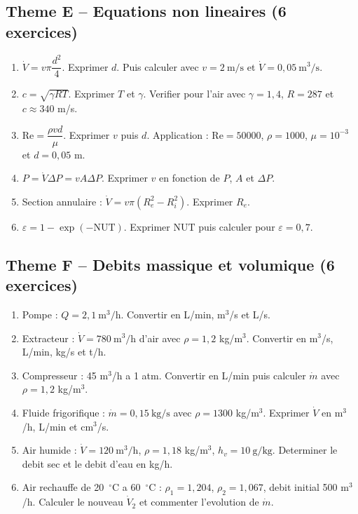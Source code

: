 \subsection*{Theme E -- Equations non lineaires (6 exercices)}
\begin{enumerate}[label=\textbf{E\arabic*}, leftmargin=1.8cm, itemsep=0.4em]
  \item $\dot{V} = v \pi \dfrac{d^2}{4}$. Exprimer $d$. Puis calculer avec $v = 2~\mathrm{m/s}$ et $\dot{V} = 0{,}05~\mathrm{m^3/s}$.
  \item $c = \sqrt{\gamma R T}$. Exprimer $T$ et $\gamma$. Verifier pour l'air avec $\gamma = 1{,}4$, $R = 287$ et $c \approx 340$ m/s.
  \item $\mathrm{Re} = \dfrac{\rho v d}{\mu}$. Exprimer $v$ puis $d$. Application : $\mathrm{Re} = 50000$, $\rho = 1000$, $\mu = 10^{-3}$ et $d = 0{,}05$ m.
  \item $P = \dot{V} \Delta P = v A \Delta P$. Exprimer $v$ en fonction de $P$, $A$ et $\Delta P$.
  \item Section annulaire : $\dot{V} = v \pi (R_e^2 - R_i^2)$. Exprimer $R_e$.
  \item $\varepsilon = 1 - \exp(-\mathrm{NUT})$. Exprimer $\mathrm{NUT}$ puis calculer pour $\varepsilon = 0{,}7$.
\end{enumerate}

\subsection*{Theme F -- Debits massique et volumique (6 exercices)}
\begin{enumerate}[label=\textbf{F\arabic*}, leftmargin=1.8cm, itemsep=0.4em]
  \item Pompe : $Q = 2{,}1~\mathrm{m^3/h}$. Convertir en L/min, m$^3$/s et L/s.
  \item Extracteur : $\dot{V} = 780~\mathrm{m^3/h}$ d'air avec $\rho = 1{,}2$ kg/m$^3$. Convertir en m$^3$/s, L/min, kg/s et t/h.
  \item Compresseur : 45 m$^3$/h a 1 atm. Convertir en L/min puis calculer $\dot{m}$ avec $\rho = 1{,}2$ kg/m$^3$.
  \item Fluide frigorifique : $\dot{m} = 0{,}15~\mathrm{kg/s}$ avec $\rho = 1300$ kg/m$^3$. Exprimer $\dot{V}$ en m$^3$/h, L/min et cm$^3$/s.
  \item Air humide : $\dot{V} = 120~\mathrm{m^3/h}$, $\rho = 1{,}18$ kg/m$^3$, $h_v = 10~\mathrm{g/kg}$. Determiner le debit sec et le debit d'eau en kg/h.
  \item Air rechauffe de 20~$^\circ$C a 60~$^\circ$C : $\rho_1 = 1{,}204$, $\rho_2 = 1{,}067$, debit initial 500 m$^3$/h. Calculer le nouveau $\dot{V}_2$ et commenter l'evolution de $\dot{m}$.
\end{enumerate}

